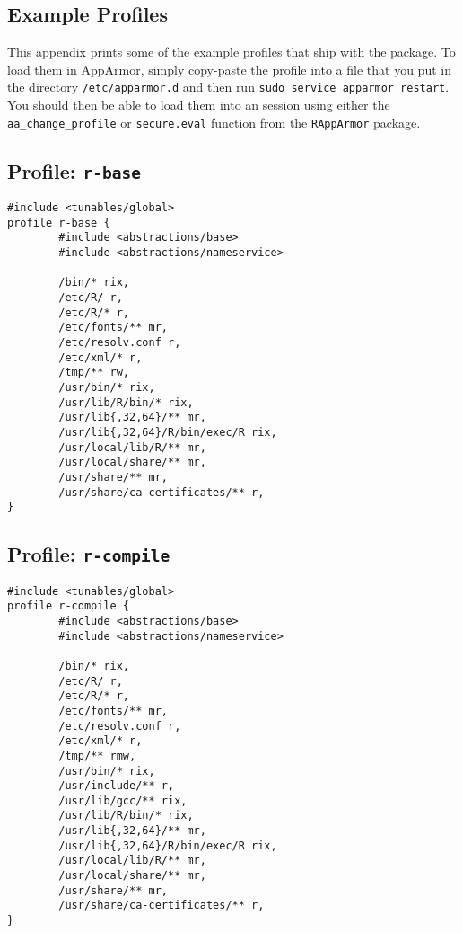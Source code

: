 \documentclass[article]{jss}
\begin{document}
\begin{appendices}
\section{Example Profiles}

This appendix prints some of the example profiles that ship with the
 package. To load them in AppArmor, simply copy-paste the
profile into a file that you put in the directory \texttt{/etc/apparmor.d} and
then run \texttt{sudo service apparmor restart}. You should then be able to load
them into an  session using either the \texttt{aa\_change\_profile}
or \texttt{secure.eval} function from the \texttt{RAppArmor} package.

\subsection[Profile: r-base]{Profile: \texttt{r-base}}
\label{r-base}

\begin{verbatim}
#include <tunables/global>
profile r-base {
        #include <abstractions/base>
        #include <abstractions/nameservice>

        /bin/* rix,
        /etc/R/ r,
        /etc/R/* r,
        /etc/fonts/** mr,
        /etc/resolv.conf r,
        /etc/xml/* r,
        /tmp/** rw,
        /usr/bin/* rix,
        /usr/lib/R/bin/* rix,
        /usr/lib{,32,64}/** mr,
        /usr/lib{,32,64}/R/bin/exec/R rix,
        /usr/local/lib/R/** mr,
        /usr/local/share/** mr,
        /usr/share/** mr,
        /usr/share/ca-certificates/** r,
}
\end{verbatim}


\subsection[Profile: r-compile]{Profile: \texttt{r-compile}}
\label{r-compile}

\begin{verbatim}
#include <tunables/global>
profile r-compile {
        #include <abstractions/base>
        #include <abstractions/nameservice>

        /bin/* rix,
        /etc/R/ r,
        /etc/R/* r,
        /etc/fonts/** mr,
        /etc/resolv.conf r,
        /etc/xml/* r,
        /tmp/** rmw,    
        /usr/bin/* rix,
        /usr/include/** r,       
        /usr/lib/gcc/** rix,		 
        /usr/lib/R/bin/* rix,
        /usr/lib{,32,64}/** mr,
        /usr/lib{,32,64}/R/bin/exec/R rix,
        /usr/local/lib/R/** mr,
        /usr/local/share/** mr,
        /usr/share/** mr,
        /usr/share/ca-certificates/** r,
}
\end{verbatim}


\end{appendices}
\end{document}
